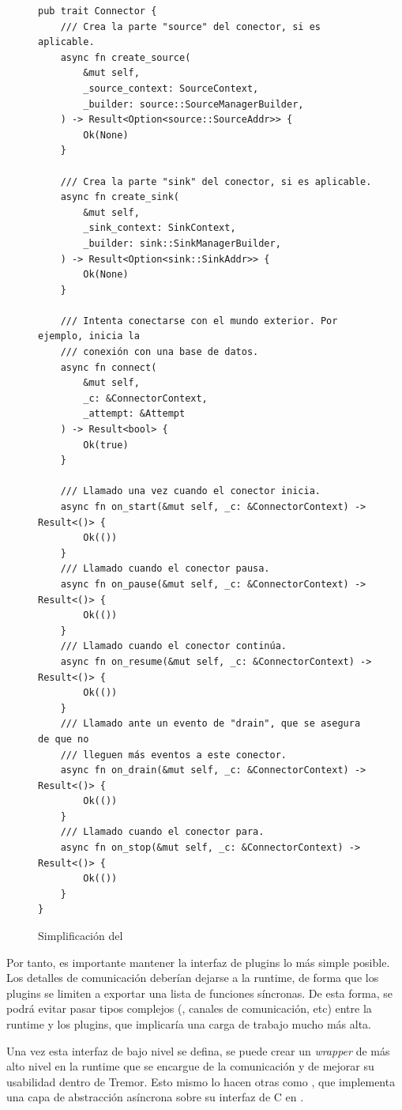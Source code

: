 \begin{figure}[h]
    \centering
    \begin{verbatim}
pub trait Connector {
    /// Crea la parte "source" del conector, si es aplicable.
    async fn create_source(
        &mut self,
        _source_context: SourceContext,
        _builder: source::SourceManagerBuilder,
    ) -> Result<Option<source::SourceAddr>> {
        Ok(None)
    }

    /// Crea la parte "sink" del conector, si es aplicable.
    async fn create_sink(
        &mut self,
        _sink_context: SinkContext,
        _builder: sink::SinkManagerBuilder,
    ) -> Result<Option<sink::SinkAddr>> {
        Ok(None)
    }

    /// Intenta conectarse con el mundo exterior. Por ejemplo, inicia la
    /// conexión con una base de datos.
    async fn connect(
        &mut self,
        _c: &ConnectorContext,
        _attempt: &Attempt
    ) -> Result<bool> {
        Ok(true)
    }

    /// Llamado una vez cuando el conector inicia.
    async fn on_start(&mut self, _c: &ConnectorContext) -> Result<()> {
        Ok(())
    }
    /// Llamado cuando el conector pausa.
    async fn on_pause(&mut self, _c: &ConnectorContext) -> Result<()> {
        Ok(())
    }
    /// Llamado cuando el conector continúa.
    async fn on_resume(&mut self, _c: &ConnectorContext) -> Result<()> {
        Ok(())
    }
    /// Llamado ante un evento de "drain", que se asegura de que no
    /// lleguen más eventos a este conector.
    async fn on_drain(&mut self, _c: &ConnectorContext) -> Result<()> {
        Ok(())
    }
    /// Llamado cuando el conector para.
    async fn on_stop(&mut self, _c: &ConnectorContext) -> Result<()> {
        Ok(())
    }
}
    \end{verbatim}
    \caption{Simplificación del \trait {}}%
    \label{fig:tremor_connector_trait}
\end{figure}

Por tanto, es importante mantener la interfaz de plugins lo más simple posible.
Los detalles de comunicación deberían dejarse a la runtime, de forma que los
plugins se limiten a exportar una lista de funciones síncronas. De esta forma,
se podrá evitar pasar tipos complejos (, canales de comunicación,
etc) entre la runtime y los plugins, que implicaría una carga de trabajo mucho
más alta.

Una vez esta interfaz de bajo nivel se defina, se puede crear un \emph{wrapper}
de más alto nivel en la runtime que se encargue de la comunicación y de mejorar
su usabilidad dentro de Tremor. Esto mismo lo hacen otras \crates como
, que implementa una capa de abstracción asíncrona sobre su
interfaz de C en .

